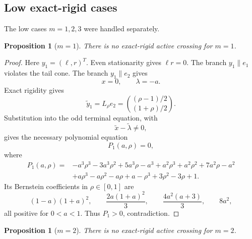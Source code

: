 \documentclass[11pt]{article}
\numberwithin{equation}{section}
\newtheorem{proposition}[theorem]{Proposition}
\begin{document}
\subsection{Low exact-rigid cases}

The low cases \(m=1,2,3\) were handled separately.

\begin{proposition}[\(m=1\)]
There is no exact-rigid active crossing for \(m=1\).
\end{proposition}

\begin{proof}
Here \(y_1=(\ell,r)^T\). Even stationarity gives \(\ell r=0\). The branch \(y_1\parallel e_1\)
violates the tail cone. The branch \(y_1\parallel e_2\) gives
\[
x=0,\qquad \lambda=-a.
\]
Exact rigidity gives
\[
\widetilde y_1=L_\rho e_2
=
\binom{(\rho-1)/2}{(1+\rho)/2}.
\]
Substitution into the odd terminal equation, with
\[
\widetilde x-\widetilde\lambda\ne0,
\]
gives the necessary polynomial equation
\[
P_1(a,\rho)=0,
\]
where
\[
\begin{aligned}
P_1(a,\rho)
={}&
-a^3\rho^3-3a^3\rho^2+5a^3\rho-a^3
+a^2\rho^3+a^2\rho^2+7a^2\rho-a^2\\
&+a\rho^3-a\rho^2-a\rho+a-\rho^3+3\rho^2-3\rho+1.
\end{aligned}
\]
Its Bernstein coefficients in \(\rho\in[0,1]\) are
\[
(1-a)(1+a)^2,\qquad
\frac{2a(1+a)^2}{3},\qquad
\frac{4a^2(a+3)}{3},\qquad
8a^2,
\]
all positive for \(0<a<1\). Thus \(P_1>0\), contradiction.
\end{proof}

\begin{proposition}[\(m=2\)]
There is no exact-rigid active crossing for \(m=2\).
\end{proposition}
\end{document}
